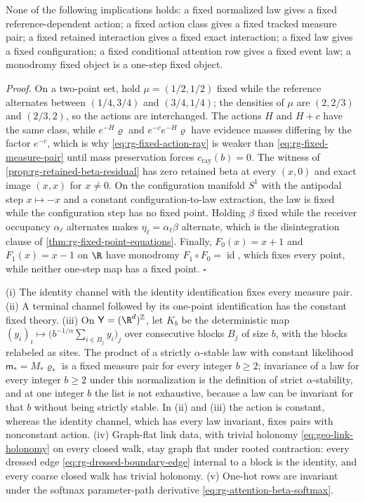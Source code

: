 None of the following implications holds: a fixed normalized law gives a fixed
reference-dependent action; a fixed action class gives a fixed tracked measure
pair; a fixed retained interaction gives a fixed exact interaction; a fixed law
gives a fixed configuration; a fixed conditional attention row gives a fixed
event law; a monodromy fixed object is a one-step fixed object.

\noindent\emph{Proof.}
On a two-point set, hold \(\mu=(1/2,1/2)\) fixed while the reference alternates
between \((1/4,3/4)\) and \((3/4,1/4)\); the densities of \(\mu\) are
\((2,2/3)\) and \((2/3,2)\), so the actions are interchanged. The actions \(H\)
and \(H+c\) have the same class, while \(e^{-H}\varrho\) and \(e^{-c}e^{-H}\varrho\)
have evidence masses differing by the factor \(e^{-c}\), which is why
\eqref{eq:rg-fixed-action-ray} is weaker than \eqref{eq:rg-fixed-measure-pair}
until mass preservation forces \(c_{\mathrm{ray}}(b)=0\). The witness of
\cref{prop:rg-retained-beta-residual} has zero retained beta at every \((x,0)\)
and exact image \((x,x)\) for \(x\neq0\). On the configuration manifold
\(S^1\) with the antipodal step \(x\mapsto-x\) and a constant
configuration-to-law extraction, the law is fixed while the configuration step
has no fixed point. Holding \(\beta\) fixed while the receiver occupancy
\(\alpha_\ell\) alternates makes \(\eta_\ell=\alpha_\ell\beta\) alternate, which
is the disintegration clause of \cref{thm:rg-fixed-point-equations}. Finally,
\(F_0(x)=x+1\) and \(F_1(x)=x-1\) on \(\R\) have monodromy
\(F_1\circ F_0=\operatorname{id}\), which fixes every point, while neither
one-step map has a fixed point. \(\square\)

(i) The identity channel with the identity identification fixes every measure
pair. (ii) A terminal channel followed by its one-point identification has the
constant fixed theory. (iii) On \(\mathsf Y=(\R^d)^{\mathbb Z}\), let \(K_b\) be
the deterministic map
\((y_i)_i\mapsto\bigl(b^{-1/\alpha}\sum_{i\in B_j}y_i\bigr)_j\) over consecutive
blocks \(B_j\) of size \(b\), with the blocks relabeled as sites. The product of
a strictly \(\alpha\)-stable law with constant likelihood \(\mathsf m_*=M_*\varrho_*\) is a
fixed measure pair for every integer \(b\geq2\); invariance of a law for every
integer \(b\geq2\) under this normalization is the definition of strict
\(\alpha\)-stability, and at one integer \(b\) the list is not exhaustive,
because a law can be invariant for that \(b\) without being strictly stable. In
(ii) and (iii) the action is constant, whereas the identity channel, which has
every law invariant, fixes pairs with nonconstant action. (iv) Graph-flat link
data, with trivial holonomy \eqref{eq:geo-link-holonomy} on every closed walk,
stay graph flat under rooted contraction: every dressed edge
\eqref{eq:rg-dressed-boundary-edge} internal to a block is the identity, and
every coarse closed walk has trivial holonomy. (v) One-hot rows are invariant
under the softmax parameter-path derivative \eqref{eq:rg-attention-beta-softmax}.

